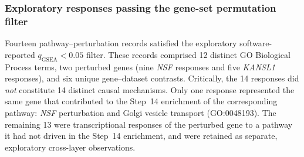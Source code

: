 \documentclass[11pt,a4paper]{article}
\begin{document}
\subsubsection{Exploratory responses passing the gene-set permutation filter}
\label{subsec:step16_filtered}
Fourteen pathway--perturbation records satisfied the exploratory software-reported $q_{\mathrm{GSEA}}<0.05$ filter. These records comprised 12 distinct GO Biological Process terms, two perturbed genes (nine \textit{NSF} responses and five \textit{KANSL1} responses), and six unique gene--dataset contrasts. Critically, the 14 responses did \emph{not} constitute 14 distinct causal mechanisms. Only one response represented the same gene that contributed to the Step~14 enrichment of the corresponding pathway: \textit{NSF} perturbation and Golgi vesicle transport (GO:0048193). The remaining 13 were transcriptional responses of the perturbed gene to a pathway it had not driven in the Step~14 enrichment, and were retained as separate, exploratory cross-layer observations.
\end{document}
